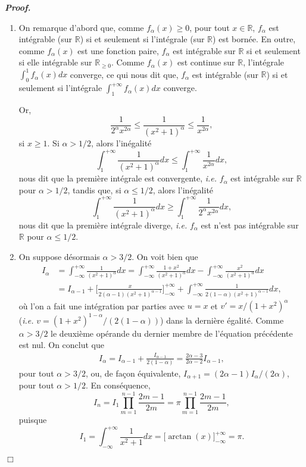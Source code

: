\documentclass[11pt,a4paper]{article}
\newcommand{\RR}{\mathbb{R}}
\newenvironment{preuve}[1][]
{\vskip 2mm  \noindent\emph{\bf Proof#1. }}{$\Box$ \vskip 2mm}
\let\geq\geqslant
\let\leq\leqslant
\begin{document}
	\begin{preuve}
		\begin{enumerate}
			\item 
			On remarque d'abord que, comme $f_{\alpha}(x) \geq 0$, pour tout $ x \in \RR$, $f_{\alpha}$ est intégrable (sur $\RR$) si et seulement si l'intégrale (sur $\RR$) est bornée. 
			En outre, comme $f_{\alpha}(x) $ est une fonction paire, $f_{\alpha}$ est intégrable sur $\RR$ si et seulement si elle intégrable sur 
			$\RR_{\geq 0}$. 
			Comme $f_{\alpha}(x) $ est continue sur $\RR$, l'intégrale $\int_{0}^{1} f_{\alpha}(x) dx$ converge, ce qui nous dit que, 
			$f_{\alpha}$ est intégrable (sur $\RR$) si et seulement si l'intégrale $\int_{1}^{+\infty} f_{\alpha}(x) dx$ converge. 
			
			Or, 
			\[      \frac{1}{2^{\alpha} x^{2 \alpha}} \leq \frac{1}{(x^2+1)^{\alpha}} \leq \frac{1}{x^{2 \alpha}},     \]
			si $x \geq 1$. 
			Si $\alpha > 1/2$, alors l'inégalité 
			\[      \int_{1}^{+\infty} \frac{1}{(x^2+1)^{\alpha}} dx  \leq \int_{1}^{+\infty} \frac{1}{x^{2 \alpha}} dx,     \]
			nous dit que la première intégrale est convergente, \textit{i.e.} $f_{\alpha}$ est intégrable sur $\RR$ pour $\alpha > 1/2$, tandis que, 
			si $\alpha \leq 1/2$, alors l'inégalité 
			\[      \int_{1}^{+\infty} \frac{1}{(x^2+1)^{\alpha}} dx  \geq \int_{1}^{+\infty} \frac{1}{2^{\alpha} x^{2 \alpha}} dx,     \]
			nous dit que la première intégrale diverge, \textit{i.e.} $f_{\alpha}$ est n'est pas intégrable sur $\RR$ pour $\alpha \leq 1/2$.
			
			\item On suppose désormais $\alpha > 3/2$. 
			On voit bien que 
			\begin{align*}
			I_{\alpha} &= \int_{-\infty}^{+\infty} \frac{1}{(x^2+1)^{\alpha}} dx 
			= \int_{-\infty}^{+\infty} \frac{1+x^{2}}{(x^2+1)^{\alpha}} dx - \int_{-\infty}^{+\infty} \frac{x^{2}}{(x^2+1)^{\alpha}} dx  
			\\ 
			&=   I_{\alpha-1} + \bigg[ \frac{x}{2 (\alpha - 1) (x^2+1)^{\alpha-1}} \bigg]_{-\infty}^{+\infty} + \int_{-\infty}^{+\infty} \frac{1}{2 (1-\alpha) (x^2+1)^{\alpha-1}} dx,
			\end{align*}  
			où l'on a fait une intégration par parties avec $u = x$ et $v' = x/(1+x^{2})^{\alpha}$ (\textit{i.e.} $v = (1+x^{2})^{1-\alpha}/(2(1-\alpha))$) dans la dernière égalité. 
			Comme $\alpha > 3/2$ le deuxième opérande du dernier membre de l'équation précédente est nul. 
			On conclut que 
			\begin{align*}
			I_{\alpha} = I_{\alpha -1} + \frac{I_{\alpha-1}}{2 (1-\alpha)} = \frac{2 \alpha - 3}{2 \alpha - 2} I_{\alpha-1},
			\end{align*}
			pour tout $\alpha > 3/2$, ou, de façon équivalente, $I_{\alpha+1} = (2 \alpha - 1) I_{\alpha}/(2 \alpha)$, pour tout $\alpha > 1/2$. 
			En conséquence, 
			\[     I_{n} = I_{1} \prod_{m=1}^{n-1} \frac{2 m - 1}{2 m} = \pi \prod_{m=1}^{n-1} \frac{2 m - 1}{2 m},     \]
			puisque 
			\[     I_{1} = \int_{-\infty}^{+\infty} \frac{1}{x^2+1} dx = \bigg[ \arctan(x) \bigg]_{-\infty}^{+\infty} = \pi.     \]
			

\end{enumerate}
\end{preuve}
\end{document}
